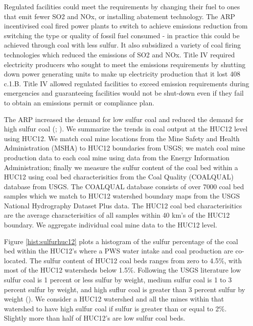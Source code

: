 \documentclass{article}
\begin{document}
Regulated facilities could meet the requirements by changing their fuel to ones that emit fewer SO2 and NOx, or installing abatement technology. The ARP incentivised coal fired power plants to switch to achieve emissions reduction from switching the type or quality of fossil fuel consumed - in practice this could be achieved through coal with less sulfur. It also subsidized a variety of coal firing technologies which reduced the emissions of SO2 and NOx. Title IV required electricity producers who sought to meet the emissions requirements by shutting down power generating units to make up electricity production that it lost 408 c.1.B. Title IV allowed regulated  facilities to exceed emission requirements during emergencies and guaranteeing facilities would not be shut-down even if they fail to obtain an emissions permit or compliance plan.

The ARP increased the demand for low sulfur coal and reduced the demand for high sulfur coal (\cite{epaarpcoalemp}; \cite{stratford2015coalprod}). We summarize the trends in coal output at the HUC12 level using HUC12. We match coal mine locations from the Mine Safety and Health Administration (MSHA) to HUC12 boundaries from USGS; we match coal mine production data to each coal mine using data from the Energy Information Administration; finally we measure the sulfur content of the coal bed within a HUC12 using coal bed characterisitics from the Coal Quality (COALQUAL) database from USGS. The COALQUAL database consists of over 7000 coal bed samples which we match to HUC12 watershed boundary maps from the USGS National Hydrography Dataset Plus data. The HUC12 coal bed characterisitics are the average characterisitics of all samples within 40 km's of the HUC12 boundary. We aggregate individual coal mine data to the HUC12 level. 

Figure \ref{hist:sulfurhuc12} plots a histogram of the sulfur percentage of the coal bed within the HUC12's where a PWS water intake and coal production are co-located. The sulfur content of HUC12 coal beds ranges from zero to 4.5\%, with most of the HUC12 watersheds below 1.5\%. Following the USGS literature low sulfur coal is 1 percent or less sulfur by weight, medium sulfur coal is 1 to 3 percent sulfur by weight, and high suflur coal is greater than 3 percent sulfur by weight (\cite{schweinfurth2009introduction}). We consider a HUC12 watershed and all the mines within that watershed to have high sulfur coal if sulfur is greater than or equal to 2\%. Slightly more than half of HUC12's are low sulfur coal beds.
\end{document}
